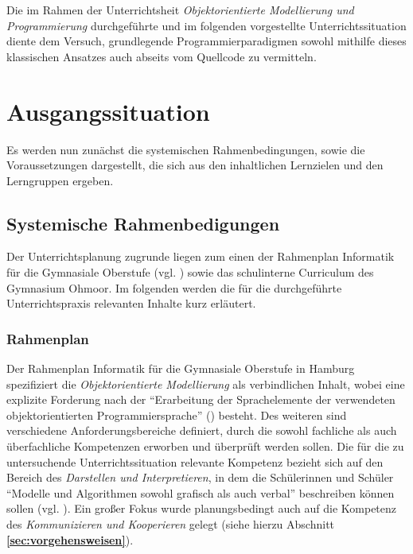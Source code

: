 \documentclass[paper=a4, DIV=13, BCOR=12mm, twoside=on, onecolumn=on, open = any, titlepage =on, parskip =half-, headsepline = on, footsepline = on, chapterprefix = on, sectionprefix = on, appendixprefix = off, fontsize = 11pt, numbers = noenddot, abstract = off]{scrreprt}
\begin{document}
Die im Rahmen der Unterrichtsheit \emph{Objektorientierte Modellierung und Programmierung} durchgeführte und im folgenden vorgestellte Unterrichtssituation diente dem Versuch, grundlegende Programmierparadigmen sowohl mithilfe dieses klassischen Ansatzes auch abseits vom Quellcode zu vermitteln.


\newpage
\par\singlespacing
\chapter{Ausgangssituation}
\onehalfspacing
Es werden nun zunächst die systemischen Rahmenbedingungen, sowie die Voraussetzungen dargestellt, die sich aus den inhaltlichen Lernzielen und den Lerngruppen ergeben.
\par\singlespacing
\section{Systemische Rahmenbedigungen}
\onehalfspacing
Der Unterrichtsplanung zugrunde liegen zum einen der Rahmenplan Informatik für die Gymnasiale Oberstufe (vgl. \cite{oberstufe:09}) sowie das schulinterne Curriculum des Gymnasium Ohmoor. Im folgenden werden die für die durchgeführte Unterrichtspraxis relevanten Inhalte kurz erläutert.
\par\singlespacing
\subsection{Rahmenplan}
\onehalfspacing
Der Rahmenplan Informatik für die Gymnasiale Oberstufe in Hamburg spezifiziert die \textit{Objektorientierte Modellierung} als verbindlichen Inhalt, wobei eine explizite Forderung nach der "`Erarbeitung der Sprachelemente der verwendeten objektorientierten Programmiersprache"' (\cite[S. 17]{oberstufe:09}) besteht. Des weiteren sind verschiedene Anforderungsbereiche definiert, durch die sowohl fachliche als auch überfachliche Kompetenzen erworben und überprüft werden sollen. Die für die zu untersuchende Unterrichtssituation relevante Kompetenz bezieht sich auf den Bereich des \textit{Darstellen und Interpretieren}, in dem die Schülerinnen und Schüler "`Modelle und Algorithmen sowohl grafisch als auch verbal"' beschreiben können sollen (vgl. \cite[S.16]{oberstufe:09}). Ein großer Fokus wurde planungsbedingt auch auf die Kompetenz des \textit{Kommunizieren und Kooperieren} gelegt (siehe hierzu Abschnitt \textbf{\ref{sec:vorgehensweisen}}).

\par \singlespacing
\end{document}

